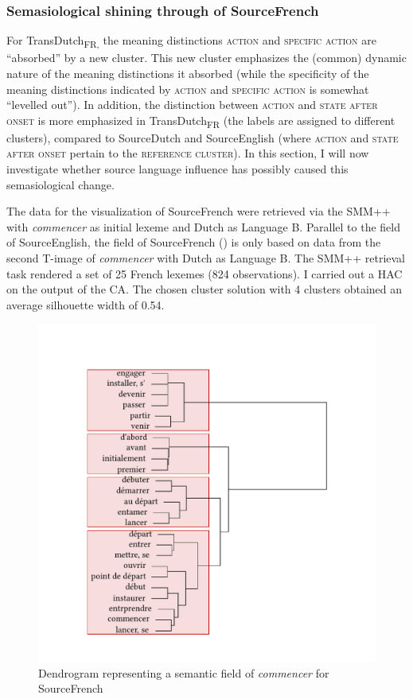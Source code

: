 \subsubsection{Semasiological shining through of SourceFrench}
\label{sec:4.6.1.2}  
For TransDutch\textsubscript{FR,} the meaning distinctions \textsc{action} and {\textsc{specific}} \textsc{action} are ``absorbed'' by a new cluster. This new cluster emphasizes the (common) dynamic nature of the meaning distinctions it absorbed (while the specificity of the meaning distinctions indicated by \textsc{action} and {\textsc{specific}} \textsc{action} is somewhat ``levelled out''). In addition, the distinction between \textsc{action} and \textsc{state after onset} is more emphasized in TransDutch\textsubscript{FR} (the labels are assigned to different clusters), compared to SourceDutch and SourceEnglish (where \textsc{action} and \textsc{state after onset} pertain to the \textsc{reference cluster}). In this section, I will now investigate whether source language influence has possibly caused this semasiological change.

The data for the visualization of SourceFrench were retrieved via the SMM++ with \textit{commencer} as initial lexeme and Dutch as Language B. Parallel to the field of SourceEnglish, the field of SourceFrench () is only based on data from the second T-image of \textit{commencer} with Dutch as Language B. The SMM++ retrieval task rendered a set of 25 French lexemes (824 observations). I carried out a HAC on the output of the CA. The chosen cluster solution with 4 clusters obtained an average silhouette width of 0.54.

\begin{figure}
\includegraphics[width=.75\textwidth,trim=0 20 0 50]{figures/tree91.pdf}
\caption{\label{fig:4:88}Dendrogram representing a semantic field of \textit{commencer} for SourceFrench}
\end{figure}

